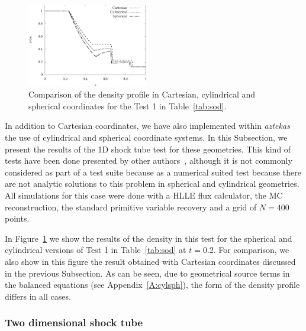 \begin{figure}
    \centering
    \includegraphics[width=0.47\textwidth]{Figures/comb.eps}
    \caption{Comparison of the density profile in Cartesian, cylindrical and spherical coordinates for the Test 1 in Table~\ref{tab:sod}.}
    \label{fig:comp}
\end{figure}

In addition to Cartesian coordinates, we have also implemented within \textit{aztekas} the use of cylindrical and spherical coordinate systems. In this Subsection, we present the results of the 1D shock tube test for these geometries. This kind of tests have been done presented by other authors~\citep[e.g.][]{radice2012,lora2015}, although it is not commonly considered as part of a test suite because as a numerical suited test because there are not analytic solutions to this problem in spherical and cylindrical geometries. All simulations for this case were done with a HLLE flux calculator, the MC reconstruction, the standard primitive variable recovery and a grid of $N=400$ points.

In Figure~\ref{fig:comp} we show the results of the density in this test for the spherical and cylindrical versions of Test 1 in Table~\ref{tab:sod} at $t=0.2$. For comparison, we also show in this figure the result obtained with Cartesian coordinates discussed in the previous Subsection. As can be seen, due to geometrical source terms in the balanced equations (see Appendix~\ref{A:cylsph}), the form of the density profile differs in all cases. 



\subsubsection{Two dimensional shock tube}
\label{subsubsec:2dsod}

